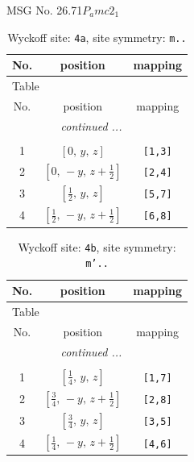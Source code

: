 \documentclass[fleqn,8pt]{jsarticle}
\begin{document}
\setcounter{MaxMatrixCols}{32}

\renewcommand{\tablename}{Table~}
\renewcommand{\figurename}{Figure~}
\begin{center}
\LARGE
MSG No. 26.71\quad$P_{a}mc2_{1}$
\end{center}
\renewcommand{\arraystretch}{1.2}
\begin{longtable}{ccc}
\caption{Wyckoff site: {\tt 4a}, site symmetry: {\tt m..}}
 \\
 \hline \hline
No. & position & mapping \\ \hline \endfirsthead

\multicolumn{2}{l}{\tablename\ \thetable{}} \\
 \hline \hline
No. & position & mapping \\ \hline \endhead

 \hline \hline
\multicolumn{2}{r}{\footnotesize\it continued ...} \\ \endfoot

 \hline \hline
\multicolumn{2}{r}{} \\ \endlastfoot

1 & $\left[ 0,\, y,\, z \right]$ & {\tt [1,3]} \\ \hline
2 & $\left[ 0,\, - y,\, z + \frac{1}{2} \right]$ & {\tt [2,4]} \\ \hline
3 & $\left[ \frac{1}{2},\, y,\, z \right]$ & {\tt [5,7]} \\ \hline
4 & $\left[ \frac{1}{2},\, - y,\, z + \frac{1}{2} \right]$ & {\tt [6,8]} \\
\end{longtable}
\renewcommand{\arraystretch}{1.2}
\begin{longtable}{ccc}
\caption{Wyckoff site: {\tt 4b}, site symmetry: {\tt m'..}}
 \\
 \hline \hline
No. & position & mapping \\ \hline \endfirsthead

\multicolumn{2}{l}{\tablename\ \thetable{}} \\
 \hline \hline
No. & position & mapping \\ \hline \endhead

 \hline \hline
\multicolumn{2}{r}{\footnotesize\it continued ...} \\ \endfoot

 \hline \hline
\multicolumn{2}{r}{} \\ \endlastfoot

1 & $\left[ \frac{1}{4},\, y,\, z \right]$ & {\tt [1,7]} \\ \hline
2 & $\left[ \frac{3}{4},\, - y,\, z + \frac{1}{2} \right]$ & {\tt [2,8]} \\ \hline
3 & $\left[ \frac{3}{4},\, y,\, z \right]$ & {\tt [3,5]} \\ \hline
4 & $\left[ \frac{1}{4},\, - y,\, z + \frac{1}{2} \right]$ & {\tt [4,6]} \\
\end{longtable}
\end{document}
